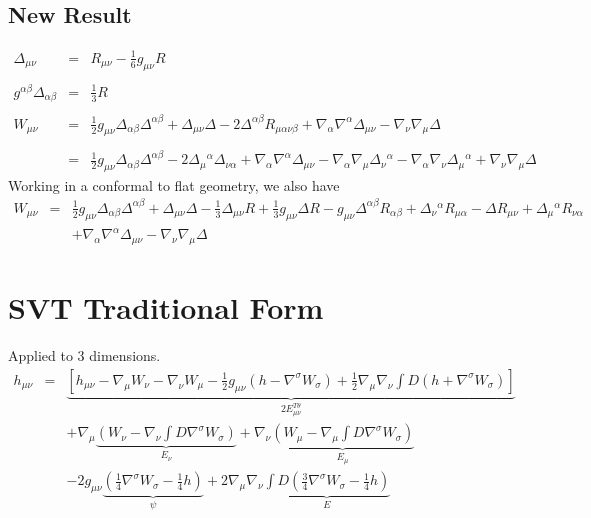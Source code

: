 \documentclass[10pt,letterpaper]{article}
\numberwithin{equation}{section}
\begin{document}
\begin{appendices}
\subsection{New Result}
%
\begin{eqnarray}
\Delta_{\mu\nu} &=& R_{\mu\nu} - \tfrac16 g_{\mu\nu} R
\\ \nonumber\\
g^{\alpha\beta}\Delta_{\alpha\beta} &=& \tfrac13 R
\\ \nonumber\\
W_{\mu\nu} &=& \tfrac{1}{2} g_{\mu \nu } \Delta_{\alpha \beta } \Delta^{\alpha \beta } + \Delta_{\mu \nu } \Delta - 2 \Delta^{\alpha \beta } R_{\mu \alpha \nu \beta } + \nabla_{\alpha }\nabla^{\alpha }\Delta_{\mu \nu } -  \nabla_{\nu }\nabla_{\mu }\Delta 
\\ \nonumber\\
&=& \tfrac{1}{2} g_{\mu \nu } \Delta_{\alpha \beta } \Delta^{\alpha \beta } - 2 \Delta_{\mu }{}^{\alpha } \Delta_{\nu \alpha } + \nabla_{\alpha }\nabla^{\alpha }\Delta_{\mu \nu } -  \nabla_{\alpha }\nabla_{\mu }\Delta_{\nu }{}^{\alpha } -  \nabla_{\alpha }\nabla_{\nu }\Delta_{\mu }{}^{\alpha } + \nabla_{\nu }\nabla_{\mu }\Delta 
\end{eqnarray}
Working in a conformal to flat geometry, we also have
\begin{eqnarray}
W_{\mu\nu} &=& \tfrac{1}{2} g_{\mu \nu } \Delta_{\alpha \beta } \Delta^{\alpha \beta } + \Delta_{\mu \nu } \Delta -  \tfrac{1}{3} \Delta_{\mu \nu } R + \tfrac{1}{3} g_{\mu \nu } \Delta R -  g_{\mu \nu } \Delta^{\alpha \beta } R_{\alpha \beta } + \Delta_{\nu }{}^{\alpha } R_{\mu \alpha } -  \Delta R_{\mu \nu } + \Delta_{\mu }{}^{\alpha } R_{\nu \alpha }
\nonumber\\
&& + \nabla_{\alpha }\nabla^{\alpha }\Delta_{\mu \nu } -  \nabla_{\nu }\nabla_{\mu }\Delta 
\end{eqnarray}
\section{SVT Traditional Form}
Applied to 3 dimensions.
\begin{eqnarray}
h_{\mu\nu}&=&\underbrace{\left[ h_{\mu\nu} - \nabla_\mu W_\nu - \nabla_\nu W_\mu - \frac12 g_{\mu\nu}(h-\nabla^\sigma W_\sigma) + \frac12 \nabla_\mu \nabla_\nu \int D(h+\nabla^\sigma W_\sigma) \right]}_{2E^{T\theta}_{\mu\nu}}
\nonumber\\
&& + \nabla_\mu \underbrace{\left(W_\nu - \nabla_\nu \int D \nabla^\sigma W_\sigma\right)}_{E_\nu}+
\nabla_\nu \underbrace{\left(W_\mu - \nabla_\mu \int D \nabla^\sigma W_\sigma\right)}_{E_\mu}
 \nonumber\\
&&
-2 g_{\mu\nu}\underbrace{(\tfrac14\nabla^\sigma W_\sigma-\tfrac14h)}_{\psi}
+2\nabla_\mu\nabla_\nu \underbrace{\int D (\tfrac34 \nabla^\sigma  W_{\sigma}-\tfrac14 h )}_{E}
\end{eqnarray}


\end{appendices}
\end{document}
